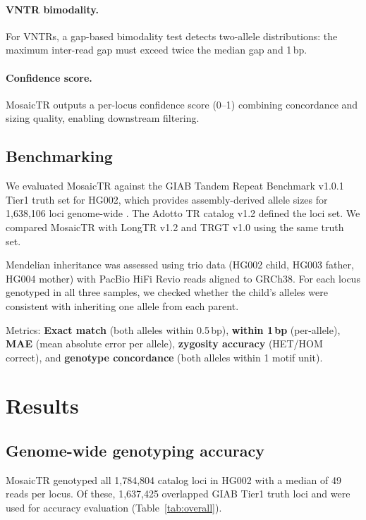 \documentclass[12pt]{article}
\begin{document}
\paragraph{VNTR bimodality.}
For VNTRs, a gap-based bimodality test detects two-allele distributions: the maximum inter-read gap must exceed twice the median gap and 1\,bp.

\paragraph{Confidence score.}
MosaicTR outputs a per-locus confidence score (0--1) combining concordance and sizing quality, enabling downstream filtering.

\subsection*{Benchmarking}

We evaluated MosaicTR against the GIAB Tandem Repeat Benchmark v1.0.1 Tier1 truth set for HG002, which provides assembly-derived allele sizes for 1,638,106 loci genome-wide \citep{wagner2024}.
The Adotto TR catalog v1.2 \citep{dolzhenko2024} defined the loci set.
We compared MosaicTR with LongTR v1.2 \citep{ziaei-jam2024} and TRGT v1.0 \citep{dolzhenko2024} using the same truth set.

Mendelian inheritance was assessed using trio data (HG002 child, HG003 father, HG004 mother) with PacBio HiFi Revio reads aligned to GRCh38.
For each locus genotyped in all three samples, we checked whether the child's alleles were consistent with inheriting one allele from each parent.

Metrics: \textbf{Exact match} (both alleles within 0.5\,bp), \textbf{within 1\,bp} (per-allele), \textbf{MAE} (mean absolute error per allele), \textbf{zygosity accuracy} (HET/HOM correct), and \textbf{genotype concordance} (both alleles within 1 motif unit).

\section*{Results}

\subsection*{Genome-wide genotyping accuracy}

MosaicTR genotyped all 1,784,804 catalog loci in HG002 with a median of 49 reads per locus.
Of these, 1,637,425 overlapped GIAB Tier1 truth loci and were used for accuracy evaluation (Table~\ref{tab:overall}).
\end{document}
